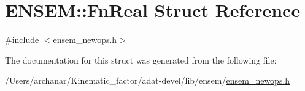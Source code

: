 \hypertarget{structENSEM_1_1FnReal}{}\section{E\+N\+S\+EM\+:\+:Fn\+Real Struct Reference}
\label{structENSEM_1_1FnReal}


{\ttfamily \#include $<$ensem\+\_\+newops.\+h$>$}



The documentation for this struct was generated from the following file\+:\begin{DoxyCompactItemize}
\item 
/\+Users/archanar/\+Kinematic\+\_\+factor/adat-\/devel/lib/ensem/\mbox{\hyperlink{adat-devel_2lib_2ensem_2ensem__newops_8h}{ensem\+\_\+newops.\+h}}\end{DoxyCompactItemize}
